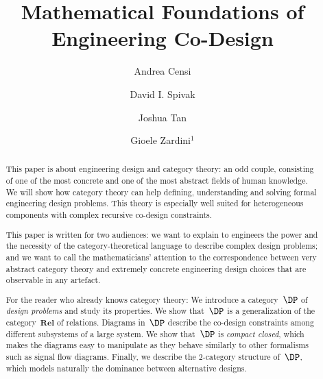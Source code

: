 \documentclass[a4paper,onecolumn, superscriptaddress,10pt,shorttitle=papers]{compositionalityarticle}
\begin{document}
\title{Mathematical Foundations of Engineering Co-Design}
\date{}
\author{Andrea Censi}
\author{David I. Spivak}
\author{Joshua Tan}
\author{Gioele Zardini$^1$}
\maketitle

\begin{abstract}
    This paper is about engineering design and
    category theory: an odd couple, consisting of one of the most concrete and
    one of the most abstract fields of human knowledge.
    We will show how category theory can help defining, understanding and
    solving formal engineering design problems.
    This theory is especially well suited for
    heterogeneous components with complex
   recursive co-design constraints.


    This paper is written for two audiences: we
    want to explain to engineers the power and the necessity of the
    category-theoretical language to describe complex design problems; and we
    want to call the mathematicians' attention to the correspondence between
    very abstract category theory and extremely concrete engineering design
    choices that are observable in any artefact.


    For the reader who already knows category theory: We introduce a category~$\DP$ of
    \emph{design problems} and study its properties. We show that~$\DP$ is a
    generalization of the category~$\textbf{Rel}$ of relations.  Diagrams
    in~$\DP$ describe the co-design constraints among different subsystems of a
    large system. We show that~$\DP$ is \emph{compact closed}, which makes the
    diagrams easy to manipulate as they behave similarly to other formalisms
    such as signal flow diagrams. Finally, we describe the 2-category structure
    of~$\DP$, which models naturally the dominance between alternative designs.
\end{abstract}
\end{document}
